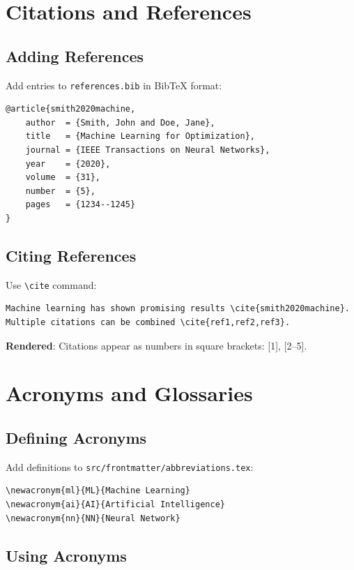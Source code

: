 \section*{Citations and References}

\subsection*{Adding References}

Add entries to \texttt{references.bib} in BibTeX format:

\begin{verbatim}
@article{smith2020machine,
    author  = {Smith, John and Doe, Jane},
    title   = {Machine Learning for Optimization},
    journal = {IEEE Transactions on Neural Networks},
    year    = {2020},
    volume  = {31},
    number  = {5},
    pages   = {1234--1245}
}
\end{verbatim}

\subsection*{Citing References}

Use \texttt{\textbackslash cite} command:

\begin{verbatim}
Machine learning has shown promising results \cite{smith2020machine}.
Multiple citations can be combined \cite{ref1,ref2,ref3}.
\end{verbatim}

\textbf{Rendered}: Citations appear as numbers in square brackets: [1], [2--5].

\section*{Acronyms and Glossaries}

\subsection*{Defining Acronyms}

Add definitions to \texttt{src/frontmatter/abbreviations.tex}:

\begin{verbatim}
\newacronym{ml}{ML}{Machine Learning}
\newacronym{ai}{AI}{Artificial Intelligence}
\newacronym{nn}{NN}{Neural Network}
\end{verbatim}

\subsection*{Using Acronyms}

